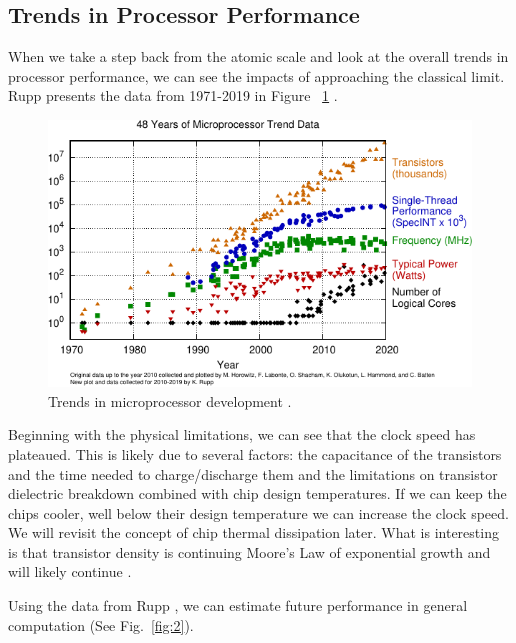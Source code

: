 \documentclass[runningheads]{llncs}
\begin{document}
\subsection{Trends in Processor Performance}
When we take a step back from the atomic scale and look at the overall trends in processor performance, we can see the impacts of approaching the classical limit.
Rupp presents the data from 1971-2019 in Figure ~\ref{fig:1} \cite{rupp2020trends}.

\begin{figure}
    \includegraphics[width=\textwidth]{48-years-processor-trend.pdf}
    \caption{Trends in microprocessor development \cite{rupp2020trends}.} \label{fig:1}
\end{figure}

Beginning with the physical limitations, we can see that the clock speed has plateaued.
This is likely due to several factors: the capacitance of the transistors and the time needed to charge/discharge them and the limitations on transistor dielectric breakdown combined with chip design temperatures.
If we can keep the chips cooler, well below their design temperature we can increase the clock speed.
We will revisit the concept of chip thermal dissipation later.
What is interesting is that transistor density is continuing Moore's Law of exponential growth and will likely continue \cite{anthony2016transistors}.

Using the data from Rupp \cite{rupp2020trends}, we can estimate future performance in general computation (See Fig.~\ref{fig:2}).
\end{document}
